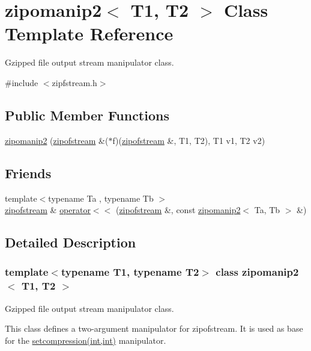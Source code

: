 \hypertarget{classzipomanip2}{}\section{zipomanip2$<$ T1, T2 $>$ Class Template Reference}
\label{classzipomanip2}


Gzipped file output stream manipulator class.  




{\ttfamily \#include $<$zipfstream.\+h$>$}

\subsection*{Public Member Functions}
\begin{DoxyCompactItemize}
\item 
\hyperlink{classzipomanip2_a58a75e53b160944fd2a2c64f472b5695}{zipomanip2} (\hyperlink{classzipofstream}{zipofstream} \&($\ast$f)(\hyperlink{classzipofstream}{zipofstream} \&, T1, T2), T1 v1, T2 v2)
\end{DoxyCompactItemize}
\subsection*{Friends}
\begin{DoxyCompactItemize}
\item 
{\footnotesize template$<$typename Ta , typename Tb $>$ }\\\hyperlink{classzipofstream}{zipofstream} \& \hyperlink{classzipomanip2_afab8cebae2ff57cf3f87fe3165a974e3}{operator$<$$<$} (\hyperlink{classzipofstream}{zipofstream} \&, const \hyperlink{classzipomanip2}{zipomanip2}$<$ Ta, Tb $>$ \&)
\end{DoxyCompactItemize}


\subsection{Detailed Description}
\subsubsection*{template$<$typename T1, typename T2$>$\newline
class zipomanip2$<$ T1, T2 $>$}

Gzipped file output stream manipulator class. 

This class defines a two-\/argument manipulator for zipofstream. It is used as base for the \hyperlink{zfstream_8h_a9faf10ab9ba2398c393ad3691421c180}{setcompression(int,int)} manipulator. 

